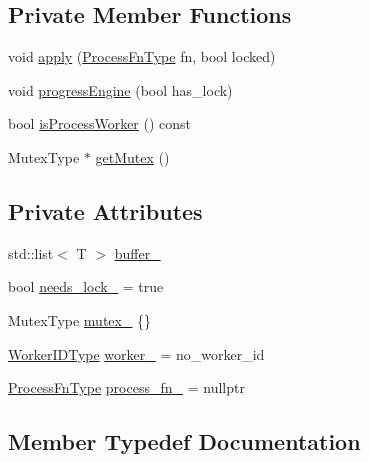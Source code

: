 \subsection*{Private Member Functions}
\begin{DoxyCompactItemize}
\item 
void \hyperlink{structvt_1_1util_1_1container_1_1_process_buffer_a92dc3217faf1e869406094e875e6a68b}{apply} (\hyperlink{structvt_1_1util_1_1container_1_1_process_buffer_a20be3480fb453096015a6fe5ca370816}{Process\+Fn\+Type} fn, bool locked)
\item 
void \hyperlink{structvt_1_1util_1_1container_1_1_process_buffer_a5cdedc99fc186a4bdfc98e274e4ad74f}{progress\+Engine} (bool has\+\_\+lock)
\item 
bool \hyperlink{structvt_1_1util_1_1container_1_1_process_buffer_a334d729082827b50b57cde7aa27f137e}{is\+Process\+Worker} () const
\item 
Mutex\+Type $\ast$ \hyperlink{structvt_1_1util_1_1container_1_1_process_buffer_aae71d070e3eb87d11a7cd5442aacdaed}{get\+Mutex} ()
\end{DoxyCompactItemize}
\subsection*{Private Attributes}
\begin{DoxyCompactItemize}
\item 
std\+::list$<$ T $>$ \hyperlink{structvt_1_1util_1_1container_1_1_process_buffer_a860ed8f4073f16af078cca408ec69a66}{buffer\+\_\+}
\item 
bool \hyperlink{structvt_1_1util_1_1container_1_1_process_buffer_af4c963364ec90b9384aaf850a95b9531}{needs\+\_\+lock\+\_\+} = true
\item 
Mutex\+Type \hyperlink{structvt_1_1util_1_1container_1_1_process_buffer_a8da1ebe17962ddcccd229f8f75f62fca}{mutex\+\_\+} \{\}
\item 
\hyperlink{namespacevt_a656e362091da17b9b93d0655b36e3392}{Worker\+I\+D\+Type} \hyperlink{structvt_1_1util_1_1container_1_1_process_buffer_aff23f09609cea327a6c6550d51d6b155}{worker\+\_\+} = no\+\_\+worker\+\_\+id
\item 
\hyperlink{structvt_1_1util_1_1container_1_1_process_buffer_a20be3480fb453096015a6fe5ca370816}{Process\+Fn\+Type} \hyperlink{structvt_1_1util_1_1container_1_1_process_buffer_afb8da7548c7c6b2ce3015edd4560a48d}{process\+\_\+fn\+\_\+} = nullptr
\end{DoxyCompactItemize}


\subsection{Member Typedef Documentation}
\mbox{\label{structvt_1_1util_1_1container_1_1_process_buffer_a20be3480fb453096015a6fe5ca370816}} 
